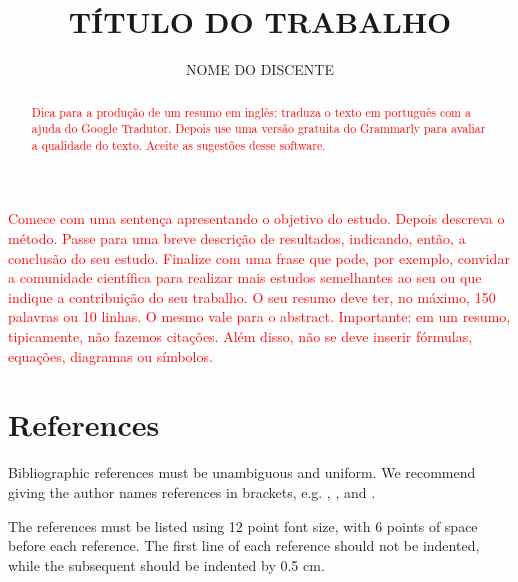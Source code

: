 \documentclass[12pt]{article}
\title{TÍTULO DO TRABALHO}
\author{NOME DO DISCENTE} %
\begin{document}
 







\renewcommand{\contentsname}{\centering \bfseries SUMÁRIO}
\tableofcontents
\thispagestyle{empty}

\clearpage
{}


\maketitle


\begin{resumo} 
  \textcolor{red}{Comece com uma sentença apresentando o objetivo do estudo. Depois descreva o método. Passe para uma breve descrição de resultados, indicando, então, a conclusão do seu estudo. Finalize com uma frase que pode, por exemplo, convidar a comunidade científica para realizar mais estudos semelhantes ao seu ou que indique a contribuição do seu trabalho. O seu resumo deve ter, no máximo, 150 palavras ou 10 linhas. O mesmo vale para o abstract. Importante: em um resumo, tipicamente, não fazemos citações. Além disso, não se deve inserir fórmulas, equações, diagramas ou símbolos.}
\end{resumo}

\begin{abstract}
  \textcolor{red}{Dica para a produção de um resumo em inglês: traduza o texto em português com a ajuda do Google Tradutor. Depois use uma versão gratuita do Grammarly para avaliar a qualidade do texto. Aceite as sugestões desse software.}
\end{abstract}




%

\section{References}

Bibliographic references must be unambiguous and uniform.  We recommend giving the author names references in brackets, e.g. ,
\cite{boulic:91}, and \cite{smith:99}.

The references must be listed using 12 point font size, with 6 points of space before each reference. The first line of each reference should not be indented, while the subsequent should be indented by 0.5 cm.

%








\end{document}
